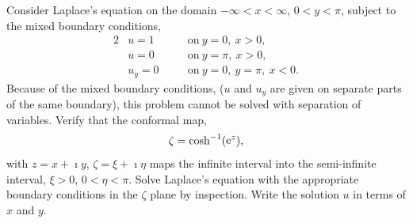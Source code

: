 {%
\begin{Exercise}
  Consider Laplace's equation on the domain $-\infty < x < \infty$, 
  $0 < y < \pi$, subject to the mixed boundary conditions,
  \begin{alignat*}{2}
    &u = 1 &\quad &\mathrm{on}\ y = 0,\ x > 0, \\
    &u = 0 &\quad &\mathrm{on}\ y = \pi,\ x > 0, \\
    &u_y = 0 &\quad &\mathrm{on}\ y = 0,\ y = \pi,\ x < 0.
  \end{alignat*}
  Because of the mixed boundary conditions, ($u$ and $u_y$ are given on separate
  parts of the same boundary), this problem cannot be solved with separation 
  of variables.  Verify that the conformal map,
  \[
  \zeta = \cosh^{-1}( \mathop{\mathrm{e}}\nolimits^z ),
  \]
  with $z = x + \imath y$, $\zeta = \xi + \imath \eta$ maps the infinite interval into
  the semi-infinite interval, $\xi > 0$, $0 < \eta < \pi$.  Solve Laplace's
  equation with the appropriate boundary conditions in the $\zeta$ plane by
  inspection.  Write the solution $u$ in terms of $x$ and $y$.
\end{Exercise}












\raggedbottom
}
